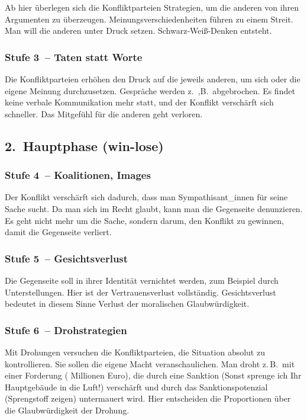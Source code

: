 Ab hier überlegen sich die Konfliktparteien Strategien, um die anderen von ihren Argumenten zu überzeugen. Meinungsverschiedenheiten führen zu einem Streit. Man will die anderen unter Druck setzen. Schwarz-Weiß-Denken entsteht.

\subsubsection{Stufe 3~-- Taten statt Worte}

Die Konfliktparteien erhöhen den Druck auf die jeweils anderen, um sich oder die eigene Meinung durchzusetzen. Gespräche werden z.~,B.~abgebrochen. Es findet keine verbale Kommunikation mehr statt, und der Konflikt verschärft sich schneller. Das Mitgefühl für die \glqq anderen\grqq{} geht verloren.


\subsection{2.~Hauptphase (win-lose)}

\subsubsection{Stufe 4~-- Koalitionen, Images}

Der Konflikt verschärft sich dadurch, dass man Sympathisant\_innen für seine Sache sucht. Da man sich im Recht glaubt, kann man die Gegenseite denunzieren. Es geht nicht mehr um die Sache, sondern darum, den Konflikt zu gewinnen, damit die Gegenseite verliert.

\subsubsection{Stufe 5~-- Gesichtsverlust}

Die Gegenseite soll in ihrer Identität vernichtet werden, zum Beispiel durch Unterstellungen. Hier ist der Vertrauensverlust vollständig. Gesichtsverlust bedeutet in diesem Sinne Verlust der moralischen Glaubwürdigkeit.

\subsubsection{Stufe 6~-- Drohstrategien}

Mit Drohungen versuchen die Konfliktparteien, die Situation absolut zu kontrollieren. Sie sollen die eigene Macht veranschaulichen. Man droht z.\,B.~mit einer Forderung ( Millionen Euro\grqq), die durch eine Sanktion (\glqq Sonst sprenge ich Ihr Hauptgebäude in die Luft!\grqq) verschärft und durch das Sanktionspotenzial (Sprengstoff zeigen) untermauert wird. Hier entscheiden die Proportionen über die Glaubwürdigkeit der Drohung.


